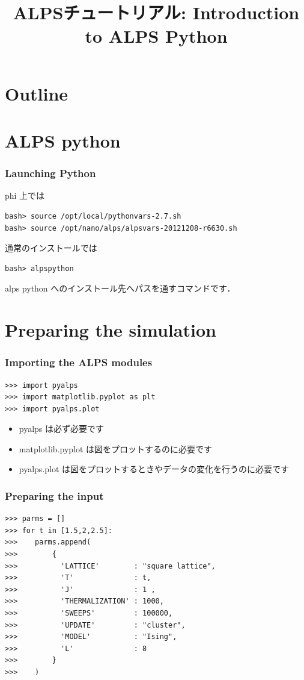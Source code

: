 
\title{ALPSチュートリアル: Introduction to ALPS Python}



\begin{frame}
  \titlepage
\end{frame}

\section*{Outline}
\begin{frame}
  \tableofcontents
\end{frame}

\section{ALPS python}
\begin{frame}[t,fragile]
\frametitle{Launching Python}
phi 上では
\begin{lstlisting}
bash> source /opt/local/pythonvars-2.7.sh
bash> source /opt/nano/alps/alpsvars-20121208-r6630.sh
\end{lstlisting}
通常のインストールでは
\begin{lstlisting}
bash> alpspython
\end{lstlisting}
alps python へのインストール先へパスを通すコマンドです．
\end{frame}

\section{Preparing the simulation}
\begin{frame}[t,fragile]
\frametitle{Importing the ALPS modules}
\begin{lstlisting}
>>> import pyalps
>>> import matplotlib.pyplot as plt
>>> import pyalps.plot
\end{lstlisting}

\begin{itemize}
\item pyalps は必ず必要です
\item matplotlib.pyplot は図をプロットするのに必要です
\item pyalps.plot は図をプロットするときやデータの変化を行うのに必要です
\end{itemize}
\end{frame}


\begin{frame}[t,fragile]
\frametitle{Preparing the input}
\begin{lstlisting}
>>> parms = []
>>> for t in [1.5,2,2.5]:
>>>    parms.append(
>>>        { 
>>>          'LATTICE'        : "square lattice", 
>>>          'T'              : t,
>>>          'J'              : 1 ,
>>>          'THERMALIZATION' : 1000,
>>>          'SWEEPS'         : 100000,
>>>          'UPDATE'         : "cluster",
>>>          'MODEL'          : "Ising",
>>>          'L'              : 8
>>>        }
>>>    )
\end{lstlisting}
\end{frame}

